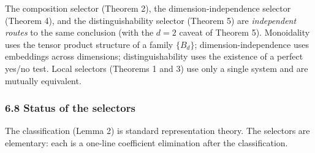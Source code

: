 \documentclass[
]{article}
\begin{document}
The composition selector (Theorem 2), the dimension-independence
selector (Theorem 4), and the distinguishability selector (Theorem 5)
are \emph{independent routes} to the same conclusion (with the \(d=2\)
caveat of Theorem 5). Monoidality uses the tensor product structure of a
family \(\{B_d\}\); dimension-independence uses embeddings across
dimensions; distinguishability uses the existence of a perfect yes/no
test. Local selectors (Theorems 1 and 3) use only a single system and
are mutually equivalent.

\subsubsection{6.8 Status of the
selectors}\label{status-of-the-selectors}

The classification (Lemma 2) is standard representation theory. The
selectors are elementary: each is a one-line coefficient elimination
after the classification.
\end{document}
